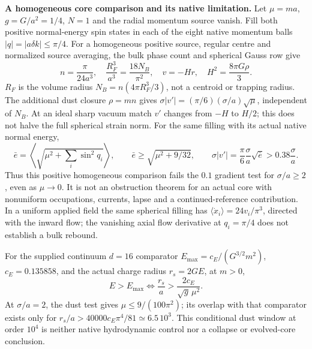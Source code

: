 \documentclass[10pt]{article}
\begin{document}
\setlength{\abovedisplayskip}{4pt}
\setlength{\belowdisplayskip}{4pt}
\noindent\textbf{A homogeneous core comparison and its native limitation.}
Let $\mu=ma$, $g=G/a^2=1/4$, $N=1$ and the radial momentum source vanish.
Fill both positive normal-energy spin states in each of the eight native
momentum balls $|q|=|a\delta k|\leq\pi/4$. For a homogeneous positive source,
regular centre and normalized source averaging, the bulk phase count and
spherical Gauss row give
\[
 n=\frac{\pi}{24a^3},\quad
 \frac{R_F^3}{a^3}=\frac{18N_B}{\pi^2},\quad
 v=-Hr,\quad H^2=\frac{8\pi G\rho}{3}.
\]
$R_F$ is the volume radius $N_B=n(4\pi R_F^3/3)$, not a centroid or
trapping radius. The additional dust closure $\rho=mn$ gives
$\sigma|v'|=(\pi/6)(\sigma/a)\sqrt\mu$, independent of $N_B$.
At an ideal sharp vacuum match $v'$ changes from $-H$ to $H/2$;
this does not halve the full spherical strain norm.
For the same filling with its actual native normal energy,
\[
 \bar e=\left\langle\sqrt{\mu^2+\sum_i\sin^2q_i}\right\rangle,
 \qquad \bar e\geq\sqrt{\mu^2+9/32},\qquad
 \sigma|v'|=\frac\pi6\frac\sigma a\sqrt{\bar e}
                 >0.38\frac\sigma a .
\]
Thus this positive homogeneous comparison fails the $0.1$ gradient test
for $\sigma/a\geq2$, even as $\mu\to0$. It is not an obstruction theorem
for an actual core with nonuniform occupations, currents, lapse and a
continued-reference contribution. In a uniform applied field the same
spherical filling has $\langle\dot x_i\rangle=24v_i/\pi^3$, directed
with the inward flow; the vanishing axial flow derivative at $q_i=\pi/4$
does not establish a bulk rebound.

For the supplied continuum $d=16$ comparator
$E_{\max}=c_E/(G^{3/2}m^2)$, $c_E=0.135858$, and the actual charge
radius $r_s=2GE$, at $m>0$,
\[
 E>E_{\max}\iff\frac{r_s}{a}>\frac{2c_E}{\sqrt g\,\mu^2}.
\]
At $\sigma/a=2$, the dust test gives $\mu\leq9/(100\pi^2)$; its overlap
with that comparator exists only for
$r_s/a>40000c_E\pi^4/81\simeq6.5\,10^3$.
This conditional dust window at order $10^4$ is neither native
hydrodynamic control nor a collapse or evolved-core conclusion.
\end{document}
